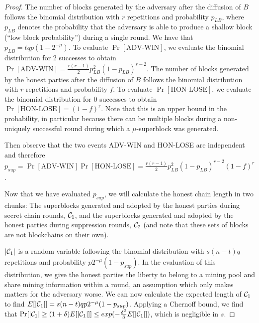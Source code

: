 \begin{proof}
The number of blocks generated by the adversary after the diffusion of $B$
follows the binomial distribution with $r$ repetitions and probability $p_{LB}$,
where $p_{LB}$ denotes the probability that the adversary is able to produce a
shallow block (``low block probability'') during a single round. We have that
$p_{LB} = tqp(1 - 2^{-\mu})$. To evaluate $\Pr[\text{ADV-WIN}]$, we evaluate the
binomial distribution for $2$ successes to obtain $\Pr[\text{ADV-WIN}] =
\frac{r(r - 1)}{2} p_{LB}^2 (1 - p_{LB})^{r - 2}$. The number of blocks
generated by the honest parties after the diffusion of $B$ follows the binomial
distribution with $r$ repetitions and probability $f$. To evaluate
$\Pr[\text{HON-LOSE}]$, we evaluate the binomial distribution for $0$ successes
to obtain $\Pr[\text{HON-LOSE}] = (1 - f)^r$. Note that this is an upper bound
in the probability, in particular because there can be multiple
blocks during a non-uniquely successful round during which a $\mu$-superblock
was generated.

Then observe that the two events ADV-WIN and HON-LOSE are independent and
therefore
$p_{sup} =
 \Pr[\text{ADV-WIN}]\Pr[\text{HON-LOSE}] =\allowbreak
 \frac{r(r - 1)}{2} p_{LB}^2 (1 - p_{LB})^{r - 2}(1 - f)^r$.

Now that we have evaluated $p_{sup}$,  we will calculate the honest chain length
in two chunks: The superblocks generated and adopted by the honest parties
during secret chain rounds, $\mathcal{C}_1$, and the superblocks generated and
adopted by the honest parties during suppression rounds, $\mathcal{C}_2$ (and note
that these sets of blocks are not blockchains on their own).

$|\mathcal{C}_1|$ is a random variable following the binomial distribution with
$s(n - t)q$ repetitions and probability $p2^{-\mu}(1 - p_{sup})$. In the
evaluation of this distribution, we give the honest parties the liberty to
belong to a mining pool and share mining information within a round, an
assumption which only makes matters for the adversary worse. We can now
calculate the expected length of $\mathcal{C}_1$ to find
$E[|\mathcal{C}_1|] = s(n - t)qp2^{-\mu}(1 - p_{sup})$. Applying a Chernoff bound, we
find that
$\Pr[|\mathcal{C}_1| \geq (1 + \delta)E[|\mathcal{C}_1|]]
\leq exp(-\frac{\delta^2}{3}E[|\mathcal{C}_1|])$, which is negligible in $s$.


\end{proof}
